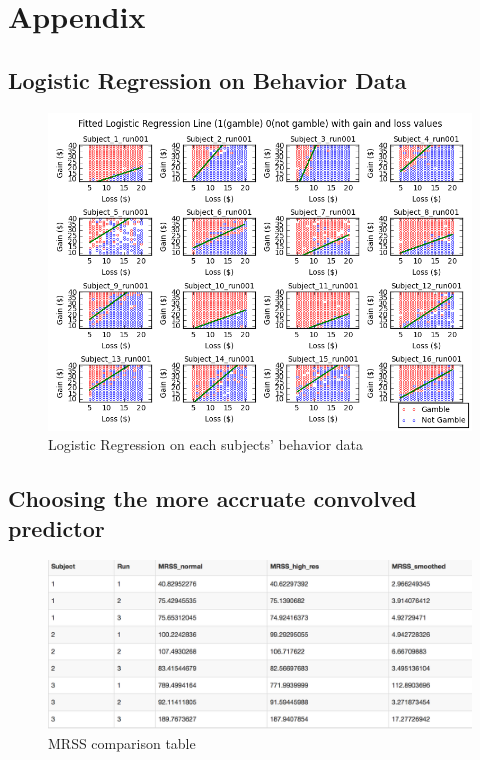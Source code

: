 \section {Appendix}
\subsection{Logistic Regression on Behavior Data}

\begin{figure}[H] 
\centering \includegraphics[scale=0.5]{../fig/log_reg_behav/log_regression_behav_subplots.png}	 
\caption{Logistic Regression on each subjects’ behavior data}
\end{figure} 

\subsection{Choosing the more accruate convolved predictor}
\begin{figure}[H] 
\centering \includegraphics[scale=0.35]{../fig/mrss_result/mrss_result.png}   
\caption{MRSS comparison table}
\end{figure} 

